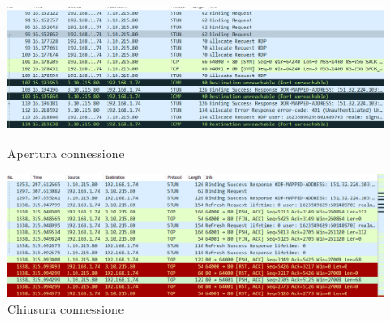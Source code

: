 \documentclass{article}
\begin{document}
  \vspace{-10pt}
  \begin{figure}[!htb]
    \begin{minipage}{0.48\textwidth}
        \centering
        \includegraphics[width=1\linewidth]{chiamatacnn1.png}
        \vspace{-20pt}
        \caption{Apertura connessione}\label{conopen}
    \end{minipage}\hfill
      \begin{minipage}{0.48\textwidth}
          \centering
          \includegraphics[width=1\linewidth]{chiamatacnn2.png}
          \vspace{-20pt}
          \caption{Chiusura connessione}\label{conclose}
      \end{minipage}\hfill
    \end{figure}
\end{document}
